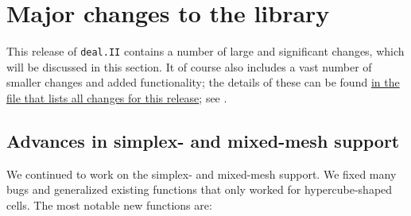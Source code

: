 \documentclass{ansarticle-preprint}
\newcommand{\specialword}[1]{\texttt{#1}}
\newcommand{\dealii}{{\specialword{deal.II}}\xspace}
\begin{document}
\section{Major changes to the library}
\label{sec:major}

This release of \dealii{} contains a number of large and significant changes,
which will be discussed in this section.
It of course also includes a
vast number of smaller changes and added functionality; the details of these
can be found
\href{https://dealii.org/developer/doxygen/deal.II/changes_between_9_3_0_and_9_4_0.html}
{in the file that lists all changes for this release}; see \cite{changes94}.


\subsection{Advances in simplex- and mixed-mesh support}\label{sec:simplex}

We continued to work on the simplex- and mixed-mesh support. We fixed
many bugs and generalized existing functions that only worked for
hypercube-shaped cells. The most notable new functions are:
\end{document}
